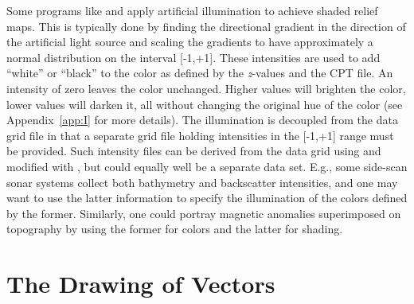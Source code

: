 Some programs like  and  apply artificial
illumination to achieve shaded relief maps.  This is typically done
by finding the directional gradient in the direction of the artificial
light source and scaling the gradients to have approximately a normal
distribution on the interval [-1,+1].  These intensities are used
to add ``white'' or ``black'' to the color as defined by the \emph{z}-values
and the CPT file.  An intensity of zero leaves the color unchanged.
Higher values will brighten the color, lower values will darken it,
all without changing the original hue of the color (see Appendix~\ref{app:I}
for more details).  The illumination is decoupled from the data
grid file in that a separate grid file holding intensities in the
[-1,+1] range must be provided.  Such intensity files can be
derived from the data grid using  and modified
with , but could equally well be a separate data set.
E.g., some side-scan sonar systems collect both bathymetry and
backscatter intensities, and one may want to use the latter information
to specify the illumination of the colors defined by the former.
Similarly, one could portray magnetic anomalies superimposed on
topography by using the former for colors and the latter for shading.

\section{The Drawing of Vectors}
\label{sec:vectors}

